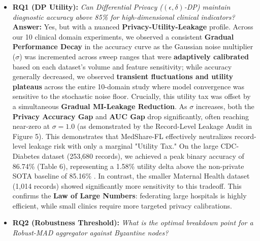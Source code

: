 \documentclass[10pt, a4paper, twocolumn]{article}
\begin{document}
\begin{itemize}
    \item \textbf{RQ1 (DP Utility):} \textit{Can Differential Privacy ($(\epsilon, \delta)$-DP) maintain diagnostic accuracy above 85\% for high-dimensional clinical indicators?} 
      \textbf{Answer:} Yes, but with a nuanced \textbf{Privacy-Utility-Leakage} profile. Across our 10 clinical domain experiments, we observed a consistent \textbf{Gradual Performance Decay} in the accuracy curve as the Gaussian noise multiplier ($\sigma$) was incremented across sweep ranges that were \textbf{adaptively calibrated} based on each dataset's volume and feature sensitivity; while accuracy generally decreased, we observed \textbf{transient fluctuations and utility plateaus} across the entire 10-domain study where model convergence was sensitive to the stochastic noise floor. Crucially, this utility tax was offset by a simultaneous \textbf{Gradual MI-Leakage Reduction}. As $\sigma$ increases, both the \textbf{Privacy Accuracy Gap} and \textbf{AUC Gap} drop significantly, often reaching near-zero at $\sigma=1.0$ (as demonstrated by the Record-Level Leakage Audit in Figure 5). This demonstrates that MedShare-FL effectively neutralizes record-level leakage risk with only a marginal "Utility Tax." On the large CDC-Diabetes dataset (253,680 records), we achieved a peak binary accuracy of 86.74\% (Table 6), representing a 1.58\% utility delta above the non-private SOTA baseline of 85.16\% \cite{chowdhury2023}. In contrast, the smaller Maternal Health dataset (1,014 records) showed significantly more sensitivity to this tradeoff. This confirms the \textbf{Law of Large Numbers}: federating large hospitals is highly efficient, while small clinics require more targeted privacy calibrations.

    \item \textbf{RQ2 (Robustness Threshold):} \textit{What is the optimal breakdown point for a Robust-MAD aggregator against Byzantine nodes?}
    

\end{itemize}
\end{document}
